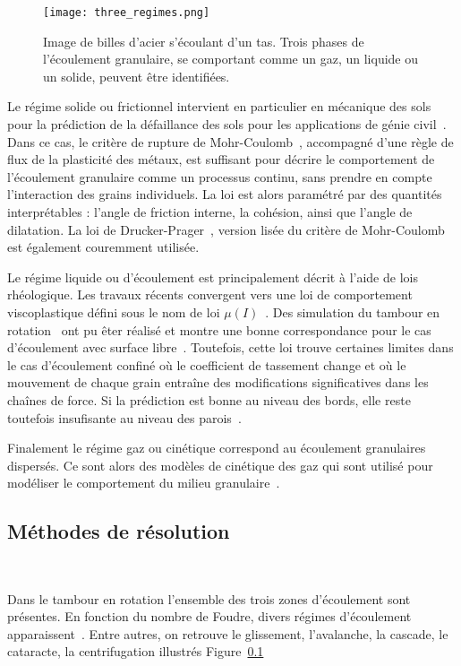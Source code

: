\begin{figure}
    \centering
    \texttt{[image: three\_regimes.png]}
    \caption{Image de billes d'acier s'écoulant d'un tas. Trois phases de l'écoulement granulaire, se comportant comme un gaz, un liquide ou un solide, peuvent être identifiées.~\cite{forterre_flows_2008}}
\end{figure}

Le régime solide ou frictionnel intervient en particulier en mécanique des sols pour la prédiction de la défaillance des sols pour les applications de génie civil~\cite{Campbell2006}. Dans ce cas, le critère de rupture de Mohr-Coulomb~\cite{Juvinal1991}, accompagné d'une règle de flux de la plasticité des métaux, est suffisant pour décrire le comportement de l'écoulement granulaire comme un processus continu, sans prendre en compte l'interaction des grains individuels. La loi est alors paramétré par des quantités interprétables : l'angle de friction interne, la cohésion, ainsi que l'angle de dilatation. La loi de Drucker-Prager~\cite{Drucker1952}, version lisée du critère de Mohr-Coulomb est également couremment utilisée.


Le régime liquide ou d'écoulement est principalement décrit à l'aide de lois rhéologique. Les travaux récents convergent vers une loi de comportement viscoplastique défini sous le nom de loi $\mu(I)$~\cite{gdr_midi_dense_2004,jop_constitutive_2006}. Des simulation du tambour en rotation~\cite{Cortet_2009} ont pu êter réalisé et montre une bonne correspondance pour le cas d'écoulement avec surface libre~\cite{chou_cross-sectional_2009}. Toutefois, cette loi trouve certaines limites dans le cas d'écoulement confiné où le coefficient de tassement change et où le mouvement de chaque grain entraîne des modifications significatives dans les chaînes de force. Si la prédiction est bonne au niveau des bords, elle reste toutefois insufisante au niveau des parois~\cite{Rognon_Miller_Metzger_Einav_2015}.

Finalement le régime gaz ou cinétique correspond au écoulement granulaires dispersés. Ce sont alors des modèles de cinétique des gaz qui sont utilisé pour modéliser le comportement du milieu granulaire~\cite{Ng2008}.

\subsection{Méthodes de résolution}~\label{sec:methode_resolution}

Dans le tambour en rotation l'ensemble des trois zones d'écoulement sont présentes. En fonction du nombre de Foudre, divers régimes d'écoulement apparaissent~\cite{MELLMANN2001251}. Entre autres, on retrouve le glissement, l'avalanche, la cascade, le cataracte, la centrifugation illustrés Figure~\ref{}

